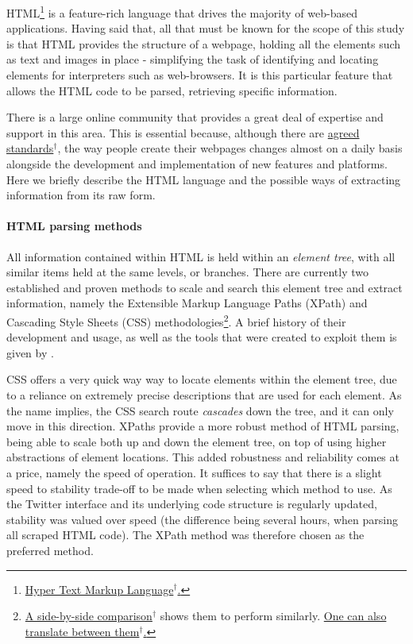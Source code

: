 \documentclass{article}
\begin{document}
HTML\footnote{\href{https://en.wikipedia.org/wiki/HTML}{Hyper Text Markup Language$^{\dag{}}$.}} is a feature-rich language that drives the majority of web-based applications. Having said that, all that must be known for the scope of this study is that HTML provides the structure of a webpage, holding all the elements such as text and images in place - simplifying the task of identifying and locating elements for interpreters such as web-browsers. It is this particular feature that allows the HTML code to be parsed, retrieving specific information.

There is a large online community that provides a great deal of expertise and support in this area. This is essential because, although there are \href{http://www.w3.org/TR/html51/}{agreed standards$^{\dag{}}$}, the way people create their webpages changes almost on a daily basis alongside the development and implementation of new features and platforms. Here we briefly describe the HTML language and the possible ways of extracting information from its raw form.


\paragraph{HTML parsing methods}
\label{sec-3-3-4-1}

All information contained within HTML is held within an \emph{element tree}, with all similar items held at the same levels, or branches. There are currently two established and proven methods to scale and search this element tree and extract information, namely the Extensible Markup Language Paths (XPath) and Cascading Style Sheets (CSS) methodologies\footnote{\href{http://elementalselenium.com/tips/32-xpath-vs-css}{A side-by-side comparison$^{\dag{}}$} shows them to perform similarly. \href{http://saucelabs.com/resources/selenium/css-selectors}{One can also translate between them$^{\dag{}}$.}}. A brief history of their development and usage, as well as the tools that were created to exploit them is given by \cite{krijnen:automated}.

CSS offers a very quick way way to locate elements within the element tree, due to a reliance on extremely precise descriptions that are used for each element. As the name implies, the CSS search route \emph{cascades} down the tree, and it can only move in this direction. XPaths provide a more robust method of HTML parsing, being able to scale both up and down the element tree, on top of using higher abstractions of element locations. This added robustness and reliability comes at a price, namely the speed of operation. It suffices to say that there is a slight speed to stability trade-off to be made when selecting which method to use. As the Twitter interface and its underlying code structure is regularly updated, stability was valued over speed (the difference being several hours, when parsing all scraped HTML code). The XPath method was therefore chosen as the preferred method.
\end{document}
